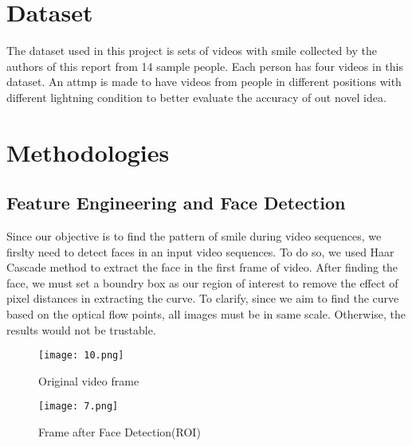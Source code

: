 \documentclass{article}
\begin{document}
{\section{Dataset}
\par{The dataset used in this project is sets of videos with smile collected by the authors of this report from 14 sample people. Each person has four videos in this dataset. An attmp is made to have videos from people in different positions with different lightning condition to better evaluate the accuracy of out novel idea.}
\section{Methodologies}
\subsection{Feature Engineering and Face Detection}
\par{Since our objective is to find the pattern of smile during video sequences, we firslty need to detect faces in an input video sequences. To do so, we used Haar Cascade method to extract the face in the first frame of video. After finding the face, we must set a boundry box as our region of interest to remove the effect of pixel distances in extracting the curve. To clarify, since we aim to find the curve based on the optical flow points, all images must be in same scale. Otherwise, the results would not be trustable.}
\begin{figure}[H]
    \centering
    \texttt{[image: 10.png]}
    \caption{Original video frame}
    \label{simulationfigure}
\end{figure}
\begin{figure}[H]
    \centering
    \texttt{[image: 7.png]}
    \caption{Frame after Face Detection(ROI)}
    \label{simulationfigure}
\end{figure}



}
\end{document}
